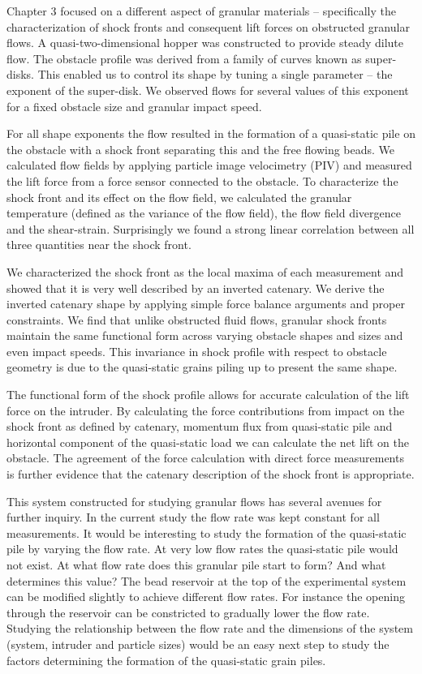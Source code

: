 Chapter 3 focused on a different aspect of granular materials – specifically the characterization of shock fronts and consequent lift forces on obstructed granular flows. A quasi-two-dimensional hopper was constructed to provide steady dilute flow. The obstacle profile was derived from a family of curves known as super-disks. This enabled us to control its shape by tuning a single parameter – the exponent of the super-disk. We observed flows for several values of this exponent for a fixed obstacle size and granular impact speed. 

For all shape exponents the flow resulted in the formation of a quasi-static pile on the obstacle with a shock front separating this and the free flowing beads. We calculated flow fields by applying particle image velocimetry (PIV) and measured the lift force from a force sensor connected to the obstacle. To characterize the shock front and its effect on the flow field, we calculated the granular temperature (defined as the variance of the flow field), the flow field divergence and the shear-strain. Surprisingly we found a strong linear correlation between all three quantities near the shock front. 

We characterized the shock front as the local maxima of each measurement and showed that it is very well described by an inverted catenary. We derive the inverted catenary shape by applying simple force balance arguments and proper constraints. We find that unlike obstructed fluid flows, granular shock fronts maintain the same functional form across varying obstacle shapes and sizes and even impact speeds. This invariance in shock profile with respect to obstacle geometry is due to the quasi-static grains piling up to present the same shape. 

The functional form of the shock profile allows for accurate calculation of the lift force on the intruder. By calculating the force contributions from impact on the shock front as defined by catenary, momentum flux from quasi-static pile and horizontal component of the quasi-static load we can calculate the net lift on the obstacle. The agreement of the force calculation with direct force measurements is further evidence that the catenary description of the shock front is appropriate. 

This system constructed for studying granular flows has several avenues for further inquiry. In the current study the flow rate was kept constant for all measurements. It would be interesting to study the formation of the quasi-static pile by varying the flow rate. At very low flow rates the quasi-static pile would not exist. At what flow rate does this granular pile start to form? And what determines this value? The bead reservoir at the top of the experimental system can be modified slightly to achieve different flow rates. For instance the opening through the reservoir can be constricted to gradually lower the flow rate. Studying the relationship between the flow rate and the dimensions of the system (system, intruder and particle sizes) would be an easy next step to study the factors determining the formation of the quasi-static grain piles.

